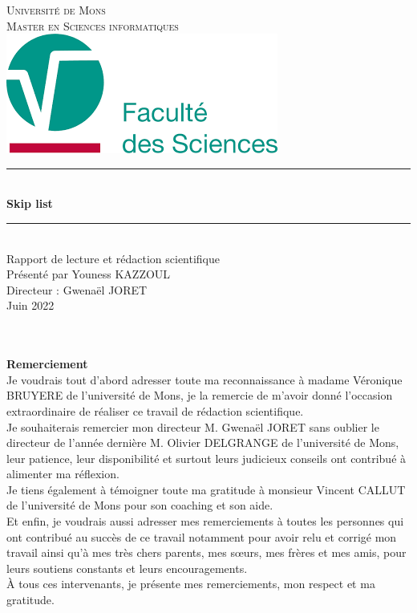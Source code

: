 \documentclass[hidelinks,a4paper,12pt]{article}
\begin{document}
	
	
	\begin{titlepage}
		\newcommand{\HRule}{\rule{\linewidth}{0.5mm}}
		\center
		\textsc{\LARGE Université de Mons } \\[1cm]
		\textsc{\Large Master en Sciences informatiques } \\[1cm]		
		\includegraphics[scale=0.3]{index.png} \\[1.5cm]
		\HRule \\[0.4cm]
		{ \huge \bfseries Skip list\\[0.15cm] }
		\HRule \\[1.1cm]
		\Large Rapport de lecture et rédaction scientifique \\[1.8cm]
		\large Présenté par Youness KAZZOUL
		\\[1.8cm]
		\large Directeur : Gwenaël JORET
		\\[1.8cm]
		Juin 2022
	\end{titlepage}
	
	\newpage
	~\\~\\
	\textbf { \Large Remerciement} 
	\\[1cm] 
	\hspace*{0.5cm} Je voudrais tout d’abord adresser toute ma reconnaissance à madame Véronique BRUYERE de l’université de Mons, je la remercie de m’avoir donné l’occasion extraordinaire de réaliser ce travail de rédaction scientifique.
	\\[0.5cm]
	Je souhaiterais remercier mon directeur M. Gwenaël JORET sans oublier le directeur de l’année dernière M. Olivier DELGRANGE de l’université de Mons, leur patience, leur disponibilité et surtout leurs judicieux conseils ont contribué à alimenter ma réflexion. 
	\\[0.5cm]
	Je tiens également à témoigner toute ma gratitude à monsieur Vincent CALLUT de l’université de Mons pour son coaching et son aide. 
	\\[0.5cm]
	Et enfin, je voudrais aussi adresser mes remerciements à toutes les personnes qui ont contribué au succès de ce travail notamment pour avoir relu et corrigé mon travail ainsi qu’à mes très chers parents, mes sœurs, mes frères et mes amis, pour leurs soutiens constants et leurs encouragements.
	\\[0.5cm]
	À tous ces intervenants, je présente mes remerciements, mon respect et ma gratitude.
\end{document}
